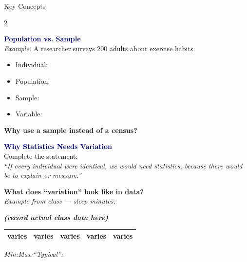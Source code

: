 \documentclass[10pt]{article}
\begin{document}
\begin{notesbox}{Key Concepts}
\small
\begin{multicols}{2}

\textbf{\textcolor{navy}{Population vs. Sample}}\\
\textit{Example:} A researcher surveys 200 adults about exercise habits.
\begin{itemize}[itemsep=2pt]
  \item Individual: 
  \item Population: 
  \item Sample: 
  \item Variable: 
\end{itemize}

\vspace{4pt}
\textbf{Why use a sample instead of a census?}\\

\columnbreak

\textbf{\textcolor{navy}{Why Statistics Needs Variation}}\\[3pt]
Complete the statement:\\[4pt]
\textit{``If every individual were identical, we would 
need statistics, because there would be 
 to explain or measure.''}

\vspace{6pt}
\textbf{What does ``variation'' look like in data?}\\
\textit{Example from class — sleep minutes:}\\[4pt]
\begin{center}
{\color{keyred}\textbf{\textit{(record actual class data here)}}}\\[2pt]
\begin{tabular}{|c|c|c|c|c|}
\hline
\textcolor{keyred}{\scriptsize varies} & \textcolor{keyred}{\scriptsize varies} &
\textcolor{keyred}{\scriptsize varies} & \textcolor{keyred}{\scriptsize varies} &
\textcolor{keyred}{\scriptsize varies} \\
\hline
\end{tabular}
\end{center}
\vspace{2pt}
\textit{Min:\;\quad Max:\;\quad ``Typical'':\;}

\end{multicols}
\end{notesbox}
\end{document}
